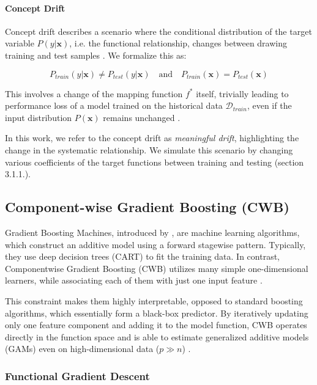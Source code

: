 \documentclass[fontsize=12 pt]{scrartcl}
\begin{document}
\paragraph{Concept Drift}

Concept drift describes a scenario where the conditional distribution of the target variable $P(y|\mathbf{x})$, i.e. the functional relationship, changes between drawing training and test samples \citep{widmer1996learning, gama2014survey}. We formalize this as: 

\begin{equation}
    P_{train}(y|\mathbf{x}) \neq P_{test}(y|\mathbf{x}) \quad \text{and} \quad P_{train}(\mathbf{x}) = P_{test}(\mathbf{x})
\end{equation}

This involves a change of the mapping function $f^*$ itself, trivially leading to performance loss of a model trained on the historical data $\mathcal{D}_{train}$, even if the input distribution $P(\mathbf{x})$ remains unchanged \citep{lu2020learning}. 

In this work, we refer to the concept drift as \textit{meaningful drift}, highlighting the change in the systematic relationship. We simulate this scenario by changing various coefficients of the target functions between training and testing (section 3.1.1.).

\subsection{Component-wise Gradient Boosting (CWB)}

Gradient Boosting Machines, introduced by \citet{friedman2001greedy}, are machine learning algorithms, which construct an additive model using a forward stagewise pattern. Typically, they use deep decision trees (CART) to fit the training data. In contrast, Componentwise Gradient Boosting (CWB) utilizes many simple one-dimensional learners, while associating each of them with just one input feature \citep{buhlmann2003boosting}. 

This constraint makes them highly interpretable, opposed to standard boosting algorithms, which essentially form a black-box predictor. By iteratively updating only one feature component and adding it to the model function, CWB operates directly in the function space and is able to estimate generalized additive models (GAMs) even on high-dimensional data ($p \gg n$) \citep{buhlmann2007boosting}.

\subsubsection{Functional Gradient Descent}
\end{document}
